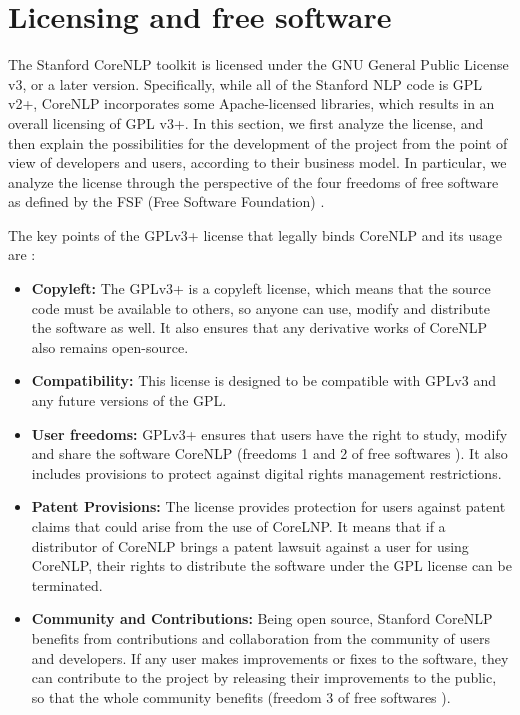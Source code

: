 \documentclass{classeENS}
\begin{document}
 \section{Licensing and free software}\label{sec:licesing}

The Stanford CoreNLP toolkit is licensed under the GNU General Public License v3, or a later version. Specifically, while all of the Stanford NLP code is GPL v2+, CoreNLP incorporates some Apache-licensed libraries, which results in an overall licensing of GPL v3+. In this section, we first analyze the license, and then explain the possibilities for the development of the project from the point of view of developers and users, according to their business model. In particular, we analyze the license through the perspective of the four freedoms of free software as defined by the FSF (Free Software Foundation) \cite{FSFfreedoms}. 
 
The key points of the GPLv3+ license that legally binds CoreNLP and its usage are :
\begin{itemize}
    \item \textbf{Copyleft:} The GPLv3+ is a copyleft license, which means that the source code must be available to others, so anyone can use, modify and distribute the software as well. It also ensures that any derivative works of CoreNLP also remains open-source.
    
    \item \textbf{Compatibility:} This license is designed to be compatible with GPLv3 and any future versions of the GPL.

    \item \textbf{User freedoms:} GPLv3+ ensures that users have the right to study, modify and share the software CoreNLP (freedoms 1 and 2 of free softwares \cite{FSFfreedoms}). It also includes provisions to protect against digital rights management restrictions.

    \item \textbf{Patent Provisions:} The license provides protection for users against patent claims that could arise from the use of CoreLNP.  It means that if a distributor of CoreNLP brings a patent lawsuit against a user for using CoreNLP, their rights to distribute the software under the GPL license can be terminated.
    
    \item \textbf{Community and Contributions:} Being open source, Stanford CoreNLP benefits from contributions and collaboration from the community of users and developers. If any user makes improvements or fixes to the software, they can contribute to the project by releasing their improvements to the public, so that the whole community benefits (freedom 3 of free softwares \cite{FSFfreedoms}).
\end{itemize}
\end{document}
